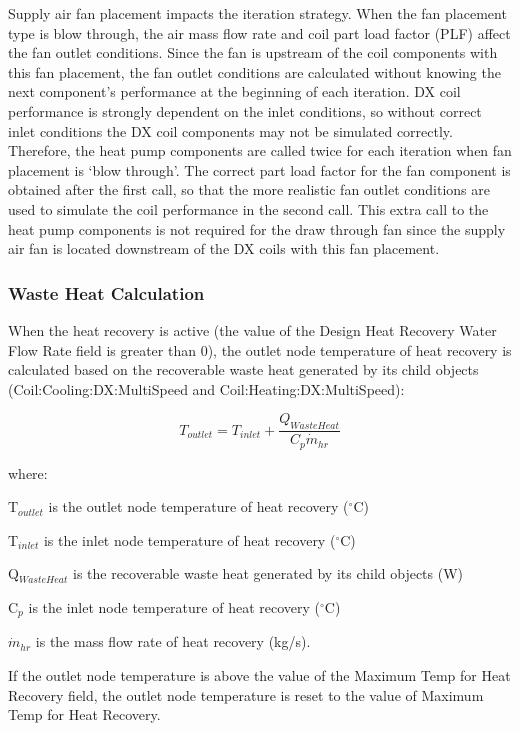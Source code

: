 Supply air fan placement impacts the iteration strategy. When the fan placement type is blow through, the air mass flow rate and coil part load factor (PLF) affect the fan outlet conditions. Since the fan is upstream of the coil components with this fan placement, the fan outlet conditions are calculated without knowing the next component's performance at the beginning of each iteration. DX coil performance is strongly dependent on the inlet conditions, so without correct inlet conditions the DX coil components may not be simulated correctly. Therefore, the heat pump components are called twice for each iteration when fan placement is `blow through'. The correct part load factor for the fan component is obtained after the first call, so that the more realistic fan outlet conditions are used to simulate the coil performance in the second call. This extra call to the heat pump components is not required for the draw through fan since the supply air fan is located downstream of the DX coils with this fan placement.

\subsubsection{Waste Heat Calculation}\label{waste-heat-calculation-1}

When the heat recovery is active (the value of the Design Heat Recovery Water Flow Rate field is greater than 0), the outlet node temperature of heat recovery is calculated based on the recoverable waste heat generated by its child objects (Coil:Cooling:DX:MultiSpeed and Coil:Heating:DX:MultiSpeed):

\begin{equation}
{T_{outlet}} = {T_{inlet}} + \frac{{{Q_{WasteHeat}}}}{{{C_p}{{\dot m}_{hr}}}}
\end{equation}

where:

T\(_{outlet}\) is the outlet node temperature of heat recovery (\(^{\circ}\)C)

T\(_{inlet}\) is the inlet node temperature of heat recovery (\(^{\circ}\)C)

Q\(_{WasteHeat}\) is the recoverable waste heat generated by its child objects (W)

C\(_{p}\) is the inlet node temperature of heat recovery (\(^{\circ}\)C)

\({{{\dot m}_{hr}}}\) is the mass flow rate of heat recovery (kg/s).

If the outlet node temperature is above the value of the Maximum Temp for Heat Recovery field, the outlet node temperature is reset to the value of Maximum Temp for Heat Recovery.

